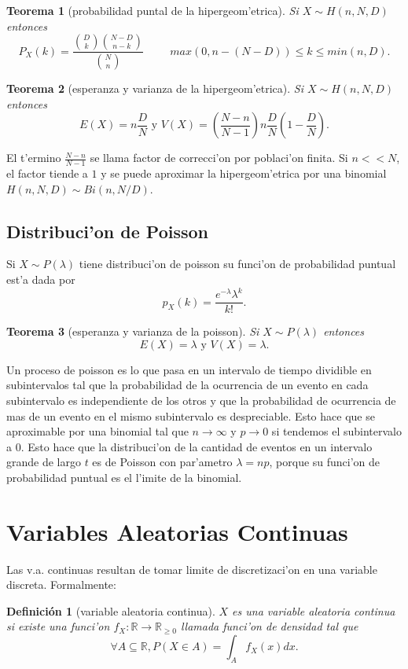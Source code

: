 \documentclass[a4paper,spanish]{article}
\newcommand{\R}[0]{\mathbb{R}}
\newtheorem{teo}{Teorema}
\newtheorem{defi}{Definici\'on}
\begin{document}
\begin{teo}[probabilidad puntal de la hipergeom'etrica]
Si $X \sim H(n,N,D)$ entonces
$$P_X(k) = \frac{ {D \choose k} {N-D \choose n-k} }
                { {N \choose n}  } \hspace{1cm} 
                	max(0,n-(N-D)) \leq k \leq min(n,D).$$
\end{teo}

\begin{teo}[esperanza y varianza de la hipergeom'etrica]
Si $X \sim H(n,N,D)$ entonces
$$E(X) = n\frac{D}{N} \mbox{\ \ y\ \ } V(X)=\left(\frac{N-n}{N-1}\right)
	n\frac{D}{N}\left(1-\frac{D}{N}\right).$$
\end{teo}

El t'ermino $\frac{N-n}{N-1}$ se llama factor de correcci'on por poblaci'on
finita. Si $n << N$, el factor tiende a $1$ y se puede aproximar la 
hipergeom'etrica por una binomial $H(n,N,D) \sim Bi(n,N/D)$.

\subsection{Distribuci'on de Poisson}

Si $X \sim P(\lambda)$ tiene distribuci'on de poisson su funci'on de
probabilidad puntual est'a dada por
$$p_X(k) = \frac{e^{-\lambda} \lambda^k}{k!}.$$


\begin{teo}[esperanza y varianza de la poisson]
Si $X \sim P(\lambda)$ entonces
$$E(X) = \lambda \mbox{\ \ y\ \ } V(X)=\lambda.$$
\end{teo}

Un proceso de poisson es lo que pasa en un intervalo de tiempo dividible en
subintervalos tal que la probabilidad de la ocurrencia de un evento en cada
subintervalo es independiente de los otros y que la probabilidad de ocurrencia
de mas de un evento en el mismo subintervalo es despreciable. Esto hace que
se aproximable por una binomial tal que $n \to \infty$ y 
$p \to 0$ si tendemos el subintervalo a $0$. Esto hace que la
distribuci'on de la cantidad de eventos en un intervalo grande de largo $t$ es
de Poisson con par'ametro $\lambda = np$, porque su funci'on de probabilidad
puntual es el l'imite de la binomial.

\section{Variables Aleatorias Continuas}

Las v.a. continuas resultan de tomar limite de discretizaci'on en una variable
discreta. Formalmente:
\begin{defi}[variable aleatoria continua]
$X$ es una \emph{variable aleatoria continua} si existe una funci'on 
$f_X : \R \to \R_{\geq 0}$ llamada \emph{funci'on de densidad} tal que
$$\forall A \subseteq \R, P(X \in A) = \int_A f_X(x)dx.$$
\end{defi}
\end{document}
